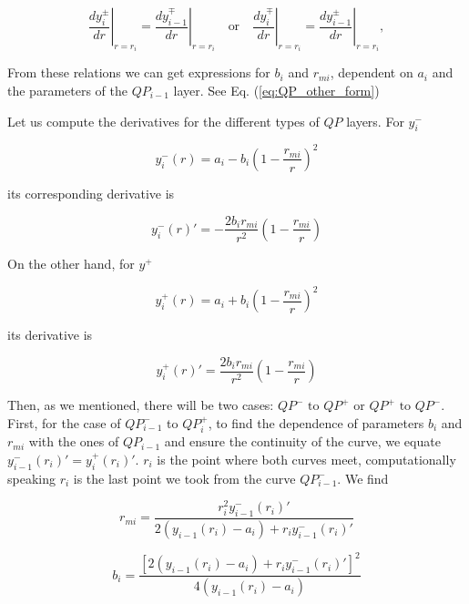\documentclass[aps,twocolumn,prb,showpacs,superscriptaddress]{revtex4-2}
\newcommand{\+}{\dagger}
\begin{document}
\begin{equation}
\left. \frac{dy_i^\pm}{dr} \right|_{r=r_i} = \left. \frac{dy_{i-1}^\mp}{dr} \right|_{r=r_i} \quad \text{or} \quad \left. \frac{dy_i^\mp}{dr} \right|_{r=r_i} = \left. \frac{dy_{i-1}^\pm}{dr} \right|_{r=r_i},
\end{equation}

From these relations we can get expressions for $b_i$ and $r_{mi}$, dependent on $a_i$ and the parameters of the $QP_{i-1}$ layer. See Eq. (\ref{eq:QP_other_form})

Let us compute the derivatives for the different types of $QP$ layers. For $y_i^-$

\begin{equation}
y_i^-(r) = a_i - b_i \left( 1 - \frac{r_{mi}}{r} \right)^2
\end{equation}

its corresponding derivative is

\begin{equation}
y_i^{-}(r)' = -\frac{2b_i r_{mi}}{r^2} \left( 1 - \frac{r_{mi}}{r} \right)
\end{equation}

On the other hand, for $y^+$

\begin{equation}
y_i^+(r) = a_i + b_i \left( 1 - \frac{r_{mi}}{r} \right)^2
\end{equation}

its derivative is

\begin{equation}
y_i^{+}(r)' = \frac{2b_i r_{mi}}{r^2} \left( 1 - \frac{r_{mi}}{r} \right)
\end{equation}

Then, as we mentioned, there will be two cases: $QP^- \text{ to } QP^+$ or $QP^+ \text{ to } QP^-$. First, for the case of $QP_{i-1}^-$ to $QP_i^+$, to find the dependence of parameters $b_i$ and $r_{mi}$ with the ones of $QP_{i-1}$ and ensure the continuity of the curve, we equate $y_{i-1}^{-}(r_i)' = y_i^{+}(r_i)'$. $r_i$ is the point where both curves meet, computationally speaking $r_i$ is the last point we took from the curve $QP_{i-1}^-$. We find

\begin{equation}
r_{mi} = \frac{r_i^2 y_{i-1}^{-}(r_i)'}{2(y_{i-1}(r_i) - a_i) + r_i y_{i-1}^{-}(r_i)'}
\end{equation}

\begin{equation}
b_i = \frac{\left[ 2(y_{i-1}(r_i) - a_i) + r_i y_{i-1}^{-}(r_i)' \right]^2}{4(y_{i-1}(r_i) - a_i)}
\end{equation}
\end{document}
